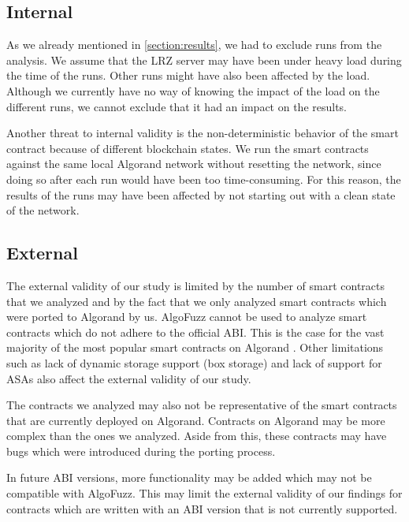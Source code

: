 \subsection*{Internal}
As we already mentioned in \ref{section:results}, we had to exclude runs from the analysis.
We assume that the LRZ server may have been under heavy load during the time of the runs.
Other runs might have also been affected by the load.
Although we currently have no way of knowing the impact of the load on the different runs, we cannot exclude that it had an impact on the results.

Another threat to internal validity is the non-deterministic behavior of the smart contract because of different blockchain states.
We run the smart contracts against the same local Algorand network without resetting the network, since doing so after each run would have been too time-consuming.
For this reason, the results of the runs may have been affected by not starting out with a clean state of the network.

\subsection*{External}
The external validity of our study is limited by the number of smart contracts that we analyzed and by the fact that we only analyzed smart contracts which were ported to Algorand by us.
AlgoFuzz cannot be used to analyze smart contracts which do not adhere to the official \ac{ABI}.
This is the case for the vast majority of the most popular smart contracts on Algorand \cite{noauthor_algorand_nodate-6}.
Other limitations such as lack of dynamic storage support (box storage) and lack of support for \acp{ASA} also affect the external validity of our study.

The contracts we analyzed may also not be representative of the smart contracts that are currently deployed on Algorand.
Contracts on Algorand may be more complex than the ones we analyzed.
Aside from this, these contracts may have bugs which were introduced during the porting process.

In future \ac{ABI} versions, more functionality may be added which may not be compatible with AlgoFuzz.
This may limit the external validity of our findings for contracts which are written with an \ac{ABI} version that is not currently supported.